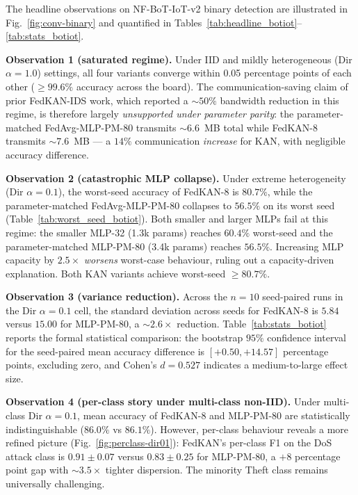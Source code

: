 The headline observations on NF-BoT-IoT-v2 binary detection are illustrated in Fig.~\ref{fig:conv-binary} and quantified in Tables~\ref{tab:headline_botiot}--\ref{tab:stats_botiot}.

\textbf{Observation 1 (saturated regime).} Under IID and mildly heterogeneous (Dir $\alpha = 1.0$) settings, all four variants converge within 0.05 percentage points of each other ($\geq 99.6\%$ accuracy across the board). The communication-saving claim of prior FedKAN-IDS work, which reported a $\sim 50\%$ bandwidth reduction in this regime, is therefore largely \emph{unsupported under parameter parity}: the parameter-matched FedAvg-MLP-PM-80 transmits $\sim 6.6$~MB total while FedKAN-8 transmits $\sim 7.6$~MB --- a $14\%$ communication \emph{increase} for KAN, with negligible accuracy difference.

\textbf{Observation 2 (catastrophic MLP collapse).} Under extreme heterogeneity (Dir $\alpha = 0.1$), the worst-seed accuracy of FedKAN-8 is $80.7\%$, while the parameter-matched FedAvg-MLP-PM-80 collapses to $56.5\%$ on its worst seed (Table~\ref{tab:worst_seed_botiot}). Both smaller and larger MLPs fail at this regime: the smaller MLP-32 (1.3k params) reaches $60.4\%$ worst-seed and the parameter-matched MLP-PM-80 (3.4k params) reaches $56.5\%$. Increasing MLP capacity by $2.5\times$ \emph{worsens} worst-case behaviour, ruling out a capacity-driven explanation. Both KAN variants achieve worst-seed $\geq 80.7\%$.

\textbf{Observation 3 (variance reduction).} Across the $n = 10$ seed-paired runs in the Dir $\alpha = 0.1$ cell, the standard deviation across seeds for FedKAN-8 is $5.84$ versus $15.00$ for MLP-PM-80, a $\sim 2.6\times$ reduction. Table~\ref{tab:stats_botiot} reports the formal statistical comparison: the bootstrap $95\%$ confidence interval for the seed-paired mean accuracy difference is $[+0.50, +14.57]$ percentage points, excluding zero, and Cohen's $d = 0.527$ indicates a medium-to-large effect size.

\textbf{Observation 4 (per-class story under multi-class non-IID).} Under multi-class Dir $\alpha = 0.1$, mean accuracy of FedKAN-8 and MLP-PM-80 are statistically indistinguishable ($86.0\%$ vs $86.1\%$). However, per-class behaviour reveals a more refined picture (Fig.~\ref{fig:perclass-dir01}): FedKAN's per-class F1 on the DoS attack class is $0.91 \pm 0.07$ versus $0.83 \pm 0.25$ for MLP-PM-80, a $+8$ percentage point gap with $\sim 3.5\times$ tighter dispersion. The minority Theft class remains universally challenging.

